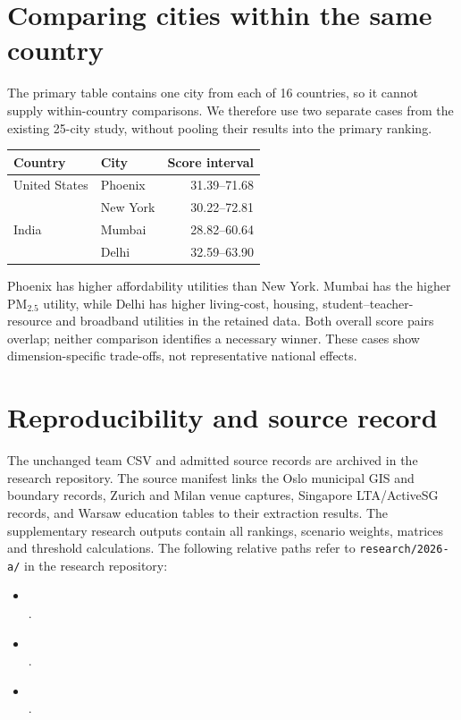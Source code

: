 \documentclass[11pt]{article}
\begin{document}
\section{Comparing cities within the same country}
The primary table contains one city from each of 16 countries, so it cannot supply within-country comparisons. We therefore use two separate cases from the existing 25-city study, without pooling their results into the primary ranking.
\begin{center}\begin{tabular}{llr}\toprule
Country & City & Score interval\\\midrule
United States & Phoenix & 31.39--71.68\\
 & New York & 30.22--72.81\\
India & Mumbai & 28.82--60.64\\
 & Delhi & 32.59--63.90\\\bottomrule
\end{tabular}\end{center}
Phoenix has higher affordability utilities than New York. Mumbai has the higher PM$_{2.5}$ utility, while Delhi has higher living-cost, housing, student--teacher-resource and broadband utilities in the retained data. Both overall score pairs overlap; neither comparison identifies a necessary winner. These cases show dimension-specific trade-offs, not representative national effects.

\section*{Reproducibility and source record}
The unchanged team CSV and admitted source records are archived in the research repository. The source manifest links the Oslo municipal GIS and boundary records, Zurich and Milan venue captures, Singapore LTA/ActiveSG records, and Warsaw education tables to their extraction results. The supplementary research outputs contain all rankings, scenario weights, matrices and threshold calculations. The following relative paths refer to \texttt{research/2026-a/} in the research repository:
\begin{itemize}
\item {}\\ .
\item {}\\ .
\item {}\\ .
\end{itemize}
\end{document}
